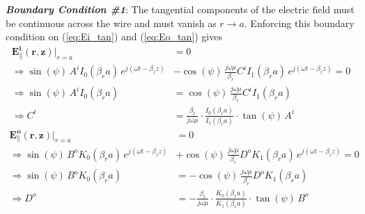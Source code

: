 \hspace*{2em} \textit{\textbf{Boundary Condition \#1}}: The tangential components of the electric field must be continuous across the wire and must vanish as $r \rightarrow a$. Enforcing this boundary condition on (\ref{eq:Ei_tan}) and (\ref{eq:Eo_tan}) gives
\begin{equation}
	\begin{split}
		\mathbf{E_{\parallel}^i(r,z)}\Big|_{r=a} &=  0 \\
		\Rightarrow\sin(\psi)\, A^i I_0(\beta_r a)\, e^{j(\omega t - \beta_z z)} 
		&- \cos(\psi)\, \frac{j\omega\mu}{\beta_r} C^i I_1(\beta_r a)\, e^{j(\omega t - \beta_z z)} = 0 \\
		\Rightarrow \sin(\psi)\, A^i I_0(\beta_r a) &= \cos(\psi)\, \frac{j\omega\mu}{\beta_r} C^i I_1(\beta_r a) \\
		\Rightarrow C^i &= \frac{\beta_r}{j\omega\mu} \cdot \frac{I_0(\beta_r a)}{I_1(\beta_r a)} \cdot \tan(\psi)\, A^i
	\end{split}
	\label{eq:Ci_expression}
\end{equation}
\begin{equation}
	\begin{split}
		\mathbf{E_{\parallel}^o(r,z)}\Big|_{r=a} &= 0 \\
		\Rightarrow\sin(\psi)\, B^o K_0(\beta_r a)\, e^{j(\omega t - \beta_z z)} 
		&+ \cos(\psi)\, \frac{j\omega\mu}{\beta_r} D^o K_1(\beta_r a)\, e^{j(\omega t - \beta_z z)} = 0 \\
		\Rightarrow \sin(\psi)\, B^o K_0(\beta_r a) &= -\cos(\psi)\, \frac{j\omega\mu}{\beta_r} D^o K_1(\beta_r a) \\
		\Rightarrow D^o &= -\frac{\beta_r}{j\omega\mu} \cdot \frac{K_0(\beta_r a)}{K_1(\beta_r a)} \cdot \tan(\psi)\, B^o
	\end{split}
	\label{eq:Do_expression}
\end{equation}


